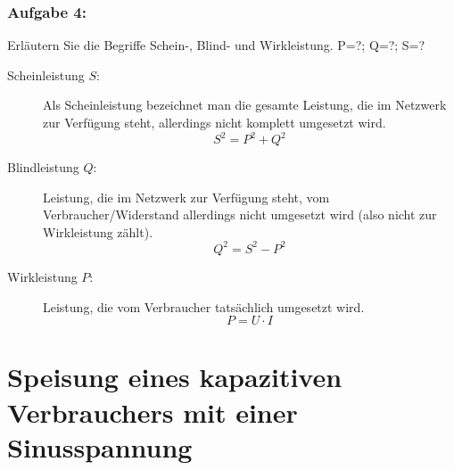 \documentclass[a4paper,titlepage,parskip]{scrreprt}
\begin{document}
                \subsubsection{Aufgabe 4:}   Erläutern Sie die Begriffe Schein-, Blind- und Wirkleistung.   P=?; Q=?; S=?
                     \begin{description}
                         \item[Scheinleistung $S$:] Als Scheinleistung bezeichnet man die gesamte Leistung, die im Netzwerk zur Verfügung steht, allerdings nicht komplett umgesetzt wird.
                         \begin{equation*}
                         S^2= P^2 + Q^2
                         \end{equation*}
                         \item[Blindleistung $Q$:] Leistung, die im Netzwerk zur Verfügung steht, vom Verbraucher/Widerstand allerdings nicht umgesetzt wird (also nicht zur Wirkleistung zählt).
                         \begin{equation*}
                         Q^2 =S^2-P^2
                         \end{equation*}
                         \item[Wirkleistung $P$:] Leistung, die vom Verbraucher tatsächlich umgesetzt wird.
                         \begin{equation*}
                         P = U \cdot I
                         \end{equation*}
                     \end{description}
                         
                         
                
                 
        \pagebreak                
        \section{Speisung eines kapazitiven Verbrauchers mit einer Sinusspannung}
\end{document}
